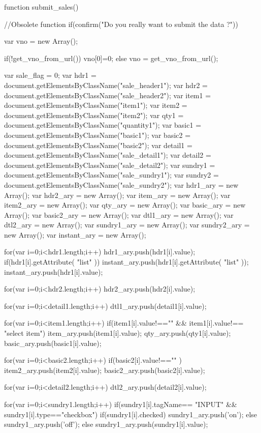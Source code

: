 function submit_sales(){//Obsolete function
	if(confirm("Do you really want to submit the data ?")){
		var vno = new Array();
		
		if(!get_vno_from_url()){
			vno[0]=0;
		}else{
			vno = get_vno_from_url();
		}
		
		var sale_flag = 0;
		var hdr1 = document.getElementsByClassName("sale_header1");
		var hdr2 = document.getElementsByClassName("sale_header2");
		var item1 = document.getElementsByClassName("item1");
		var item2 = document.getElementsByClassName("item2");
		var qty1 = document.getElementsByClassName("quantity1");
		var basic1 = document.getElementsByClassName("basic1");
		var basic2 = document.getElementsByClassName("basic2");
		var detail1 = document.getElementsByClassName("sale_detail1");
		var detail2 = document.getElementsByClassName("sale_detail2");
		var sundry1 =  document.getElementsByClassName("sale_sundry1"); 
		var sundry2 =  document.getElementsByClassName("sale_sundry2"); 
		var hdr1_ary = new Array();
		var hdr2_ary = new Array();
		var item_ary = new Array();
		var item2_ary = new Array();
		var qty_ary = new Array();
		var basic_ary = new Array();
		var basic2_ary = new Array();
		var dtl1_ary = new Array();
		var dtl2_ary = new Array();
		var sundry1_ary = new Array();
		var sundry2_ary = new Array();
		var instant_ary = new Array();
		
		for(var i=0;i<hdr1.length;i++){
			hdr1_ary.push(hdr1[i].value);
			if(hdr1[i].getAttribute( "list" )){
				instant_ary.push(hdr1[i].getAttribute( "list" ));
				instant_ary.push(hdr1[i].value);
			}
		}
		
		for(var i=0;i<hdr2.length;i++){
			hdr2_ary.push(hdr2[i].value);
		}
		
		for(var i=0;i<detail1.length;i++){
			dtl1_ary.push(detail1[i].value);
		}
		
		for(var i=0;i<item1.length;i++){
			if(item1[i].value!=="" && item1[i].value!== "select item"){
				item_ary.push(item1[i].value);
				qty_ary.push(qty1[i].value);
				basic_ary.push(basic1[i].value);
			}
		}
		
		for(var i=0;i<basic2.length;i++){
			if(basic2[i].value!=="" ){
				item2_ary.push(item2[i].value);
				basic2_ary.push(basic2[i].value);
			}
		}
		
		for(var i=0;i<detail2.length;i++){
			dtl2_ary.push(detail2[i].value);
		}
		
		for(var i=0;i<sundry1.length;i++){
			if(sundry1[i].tagName== "INPUT" && sundry1[i].type=="checkbox"){
				if(sundry1[i].checked){
					sundry1_ary.push('on');
				}else{
					sundry1_ary.push('off');
				}
			}else{
				sundry1_ary.push(sundry1[i].value);
			}
		}
		
}}
